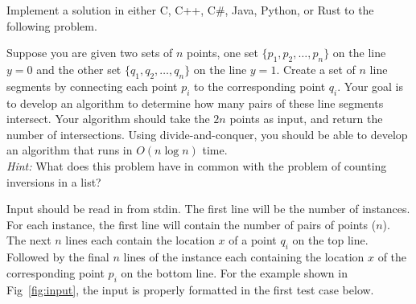 \documentclass[solutionorbox, answers]{exam}
\begin{document}
\begin{questions}

\newpage
\question Implement a solution in either C, C++, C\#, Java, Python, or Rust to the following problem.

Suppose you are given two sets of $n$ points, one set $\{p_1, p_2, \ldots, p_n\}$ on the line $y=0$ and the other set $\{q_1, q_2, \ldots, q_n\}$ on the line $y=1$. Create a set of $n$ line segments by connecting each point $p_i$ to the corresponding point $q_i$. Your goal is to develop an algorithm to determine how many pairs of these line segments intersect. Your algorithm should take the $2n$ points as input, and return the number of intersections. Using divide-and-conquer, you should be able to develop an algorithm that runs in $O(n \log{n})$ time.  \\ \textit{Hint:} What does this problem have in common with the problem of counting inversions in a list?

Input should be read in from stdin. The first line will be the number of instances. For each instance, the first line will contain the number of pairs of points ($n$). The next $n$ lines each contain the location $x$ of a point $q_i$ on the top line. Followed by the final $n$ lines of the instance each containing the location $x$ of the corresponding point $p_i$ on the bottom line. For the example shown in Fig~\ref{fig:input}, the input is properly formatted in the first test case below.


\end{questions}
\end{document}
